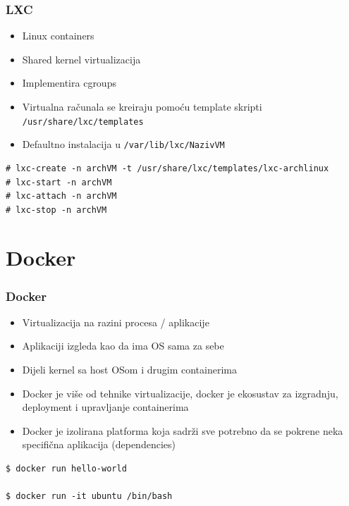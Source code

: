 \documentclass[t]{beamer}
\begin{document}
\begin{frame}[fragile]
	\frametitle{LXC}

	\begin{itemize}
		\item Linux containers

		\item Shared kernel virtualizacija
		\item Implementira cgroups
	\end{itemize}

	\begin{itemize}
		\item Virtualna računala se kreiraju pomoću template skripti \texttt{/usr/share/lxc/templates}
		\item Defaultno instalacija u \texttt{/var/lib/lxc/NazivVM}
	\end{itemize}

	\scriptsize
	\begin{verbatim}
# lxc-create -n archVM -t /usr/share/lxc/templates/lxc-archlinux
# lxc-start -n archVM
# lxc-attach -n archVM
# lxc-stop -n archVM
	\end{verbatim}

\end{frame}




\section{Docker}

\begin{frame}[fragile]
	\frametitle{Docker}

	\begin{itemize}
		\item Virtualizacija na razini procesa / aplikacije
    \item Aplikaciji izgleda kao da ima OS sama za sebe
    \item Dijeli kernel sa host OSom i drugim containerima
	\end{itemize}

  \begin{itemize}
    \item Docker je više od tehnike virtualizacije, docker je ekosustav za izgradnju, deployment i upravljanje containerima
  \end{itemize}

  \begin{itemize}
    \item Docker je izolirana platforma koja sadrži sve potrebno da se pokrene neka specifična aplikacija (dependencies)
  \end{itemize}

  \scriptsize
	\begin{verbatim}
$ docker run hello-world

$ docker run -it ubuntu /bin/bash
	\end{verbatim}

\end{frame}
\end{document}
